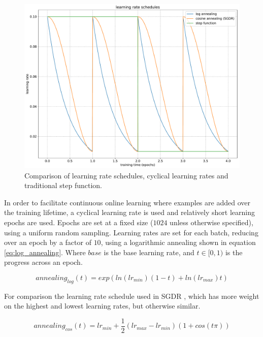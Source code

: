 \begin{figure}[h]
  \centering
  \includegraphics[width=1.0\linewidth]{charts/training/lr_schedules.pdf}
  \caption{Comparison of learning rate schedules, cyclical learning rates and traditional step function.  }  
  \label{fig:lr_schedule}
\end{figure}

In order to facilitate continuous online learning where examples are added over the training lifetime, a cyclical learning rate is used and relatively short learning epochs are used. Epochs are set at a fixed size ($1024$ unless otherwise specified), using a uniform random sampling. Learning rates are set for each batch, reducing over an epoch by a factor of $10$, using a logarithmic annealing shown in equation \ref{eq:log_annealing}. Where $base$ is the base learning rate, and $ t \in [0, 1) $ is the progress across an epoch.

\begin{equation}
annealing_{log}(t) = exp(ln (lr_{min}) (1 - t) + ln(lr_{max})  t)
\label{eq:log_annealing}
\end{equation}

For comparison the learning rate schedule used in \gls{SGDR} \cite{Loshchilov2016}, which has more weight on the highest and lowest learning rates, but otherwise similar.

\begin{equation}
annealing_{cos}(t) = lr_{min} +  \frac{1}{2} (lr_{max} - lr_{min}) (1 + cos (t \pi))
\label{eq:cosine_annealing}
\end{equation}


